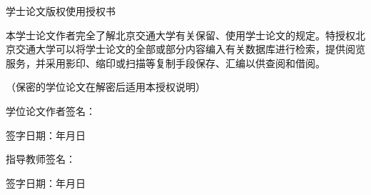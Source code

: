 \cleardoublepage{}

\thispagestyle{fancynofoot}
\vspace*{-0.53cm}
\begin{center}
{\heiti 学士论文版权使用授权书\bigskip}
\end{center}

本学士论文作者完全了解北京交通大学有关保留、使用学士论文的规定。特授权北京交通大学可以将学士论文的全部或部分内容编入有关数据库进行检索，提供阅览服务，并采用影印、缩印或扫描等复制手段保存、汇编以供查阅和借阅。\\
\vspace{-0.4cm}
\begin{center}
（保密的学位论文在解密后适用本授权说明）
\end{center}
\vspace{3cm}

\begin{minipage}[t]{0.5\textwidth}
学位论文作者签名：\vspace{4ex}

签字日期：\hspace{2em}年\hspace{2em}月\hspace{2em}日
\end{minipage} 
\hfill
\begin{minipage}[t]{0.5\textwidth}
指导教师签名：\vspace{4ex}

签字日期：\hspace{2em}年\hspace{2em}月\hspace{2em}日
\end{minipage} 	
\cleardoublepage{}
